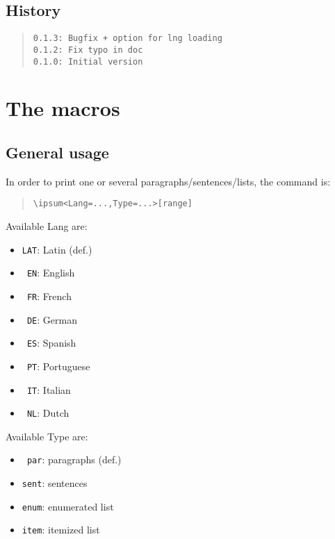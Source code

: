 \documentclass[11pt,a4paper]{ltxdoc}
\begin{document}
\vfill

\subsection{History}

\begin{quote}
\begin{verbatim}
0.1.3: Bugfix + option for lng loading
0.1.2: Fix typo in doc
0.1.0: Initial version
\end{verbatim}
\end{quote}

\pagebreak

\section{The macros}

\subsection{General usage}

In order to print one or several paragraphs/sentences/lists, the command is:

\begin{quote}
\begin{verbatim}
\ipsum<Lang=...,Type=...>[range]
\end{verbatim}
\end{quote}

Available \textsf{Lang} are:

\begin{multicols}{4}
	\begin{itemize}
		\item \texttt{LAT}: Latin (def.)
		\item \texttt{~EN}: English
		\item \texttt{~FR}: French
		\item \texttt{~DE}: German
		\item \texttt{~ES}: Spanish
		\item \texttt{~PT}: Portuguese
		\item \texttt{~IT}: Italian
		\item \texttt{~NL}: Dutch
	\end{itemize}
\end{multicols}

Available \textsf{Type} are:

\begin{multicols}{2}
	\begin{itemize}
		\item \texttt{~par}: paragraphs (def.)
		\item \texttt{sent}: sentences
		\item \texttt{enum}: enumerated list
		\item \texttt{item}: itemized list
	\end{itemize}
\end{multicols}
\end{document}
